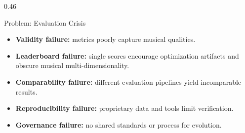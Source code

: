\documentclass{beamer}
\begin{document}
\begin{frame}[t]
\begin{columns}[t]
\begin{column}{0.46\paperwidth}
\begin{block}{Problem: Evaluation Crisis}
        \begin{itemize}
          \bigskip
          \item \textbf{Validity failure:} metrics poorly capture musical qualities.
          \bigskip
          \item \textbf{Leaderboard failure:}  single scores encourage optimization artifacts and obscure musical multi-dimensionality.
          \bigskip
          \item \textbf{Comparability failure:} different evaluation pipelines yield incomparable results.
          \bigskip
          \item \textbf{Reproducibility failure:} proprietary data and tools limit verification.
          \bigskip
          \item \textbf{Governance failure:} no shared standards or process for evolution.
        \end{itemize}

      \end{block}


\end{column}
\end{columns}
\end{frame}
\end{document}
